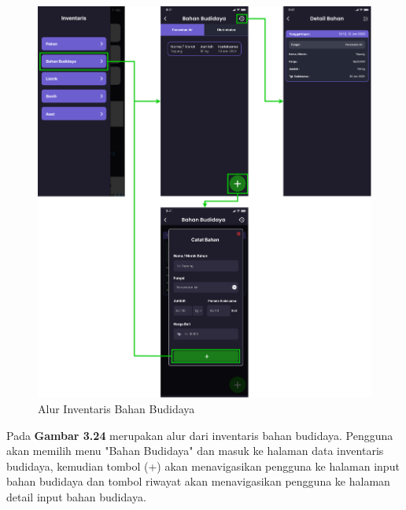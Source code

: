 \begin{enumerate}
\begin{enumerate}
		\begin{figure}[H]
			\centering
			\includegraphics[width=1\textwidth]{gambar/sprint2/flow_materials.png}
			\caption{Alur Inventaris Bahan Budidaya}
		\end{figure}

		Pada \textbf{Gambar 3.24} merupakan alur dari inventaris bahan budidaya. Pengguna akan memilih menu "Bahan Budidaya" dan masuk ke halaman data inventaris budidaya, kemudian tombol (+) akan menavigasikan pengguna ke halaman input bahan budidaya dan tombol riwayat akan menavigasikan pengguna ke halaman detail input bahan budidaya.


\end{enumerate}
\end{enumerate}
